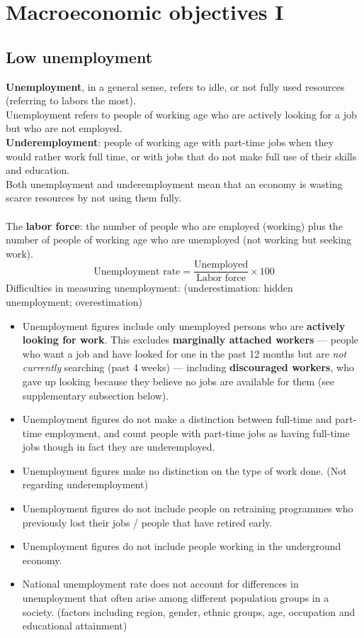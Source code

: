 \documentclass[a4paper,12pt]{article}
\newcommand{\needbold}[1]{\textcolor{red!70!black}{\textbf{#1}}}
\begin{document}
\section{Macroeconomic objectives I}
\subsection{Low unemployment}
\needbold{Unemployment}, in a general sense, refers to idle, or not fully used resources (referring to labors the most). \\
Unemployment refers to people of working age who are actively looking for a job but who are not employed.\\
\needbold{Underemployment}: people of working age with part-time jobs when they would rather work full time, or with jobs that do not make full use of their skills and education. \\
Both unemployment and underemployment mean that an economy is wasting scarce resources by not using them fully.\\\\
The \needbold{labor force}: the number of people who are employed (working) plus the number of people of working age who are unemployed (not working but seeking work).
\[\text{Unemployment rate}=\dfrac{\text{Unemployed}}{\text{Labor force}}\times 100\]
Difficulties in measuring unemployment: (underestimation: hidden unemployment; overestimation)
\begin{itemize}
  \item Unemployment figures include only unemployed persons who are \textbf{actively looking for work}. This excludes \textbf{marginally attached workers} --- people who want a job and have looked for one in the past 12 months but are \textit{not currently} searching (past 4 weeks) --- including \textbf{discouraged workers}, who gave up looking because they believe no jobs are available for them (see supplementary subsection below).
  \item Unemployment figures do not make a distinction between full-time and part-time employment, and count people with part-time jobs as having full-time jobs though in fact they are underemployed.
  \item Unemployment figures make no distinction on the type of work done. (Not regarding underemployment)
  \item Unemployment figures do not include people on retraining programmes who previously lost their jobs / people that have retired early.
  \item Unemployment figures do not include people working in the underground economy.
  \item National unemployment rate does not account for differences in unemployment that often arise among different population groups in a society. (factors including region, gender, ethnic groups, age, occupation and educational attainment)
\end{itemize}
\end{document}
